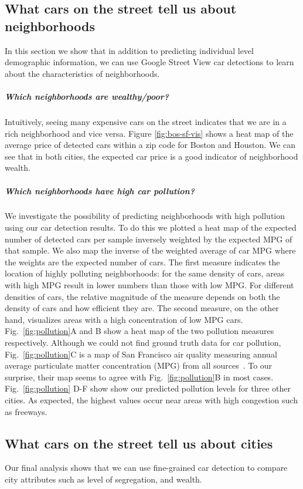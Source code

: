 \documentclass[10pt,twocolumn,letterpaper]{article}
\begin{document}
\subsection{What cars on the street tell us about neighborhoods}
In this section we show that in addition to predicting individual level demographic information, we can use Google Street View car detections to learn about the characteristics of neighborhoods.

\subparagraph{Which neighborhoods are wealthy/poor?}
Intuitively, seeing many expensive cars on the street indicates that we are in a rich neighborhood and vice versa. Figure \ref{fig:bos-sf-vis} shows a heat map of the average price of detected cars within a zip code for Boston and Houston. We can see that in both cities, the expected car price is a good indicator of neighborhood wealth.

\subparagraph{Which neighborhoods have high car pollution?}
We investigate the possibility of predicting neighborhoods with high pollution using our car detection results. To do this we plotted a heat map of the expected number of detected cars per sample inversely weighted by the expected MPG of that sample. We also map the inverse of the weighted average of car MPG where the weights are the expected number of cars. The first measure indicates the location of highly polluting neighborhoods: for the same density of cars, areas with high MPG result in lower numbers than those with low MPG. For different densities of cars, the relative magnitude of the measure depends on both the density of cars and how efficient they are. The second measure, on the other hand, visualizes areas with a high concentration of low MPG cars. Fig.~\ref{fig:pollution}A and B show a heat map of the two pollution measures respectively. Although we could not find ground truth data for car pollution, Fig.~\ref{fig:pollution}C is a map of San Francisco air quality measuring annual average particulate matter concentration (MPG) from all sources~\cite{ground_air}. To our surprise, their map seems to agree with Fig.~\ref{fig:pollution}B in most cases. Fig.~\ref{fig:pollution} D-F show show our predicted pollution levels for three other cities. As expected, the highest values occur near areas with high congestion such as freeways.


\subsection{What cars on the street tell us about cities}
Our final analysis shows that we can use fine-grained car detection to compare city attributes such as level of segregation, and wealth.
\end{document}
